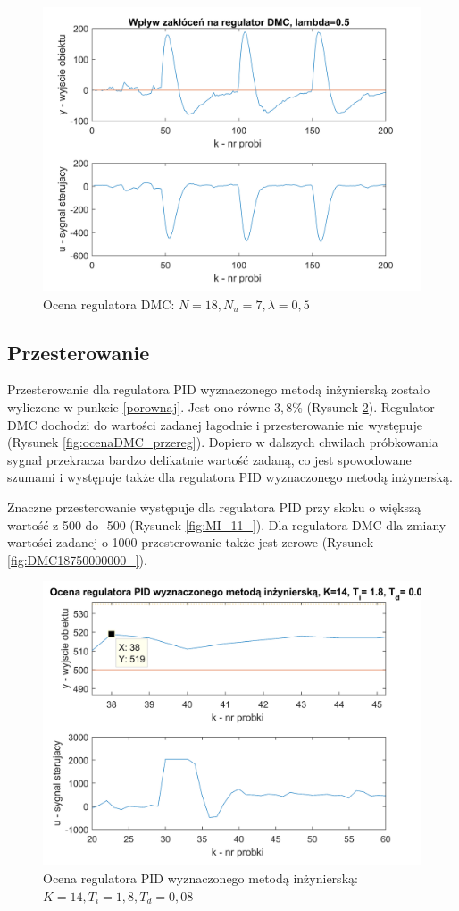 \documentclass[a4paper, 10pt]{article}
\begin{document}
\begin{figure}[H]
	\centering
	\includegraphics[width=0.9\linewidth]{dmc05zakl}
	\caption{Ocena regulatora DMC: $N=18, N_{u}=7, \lambda=0,5$}
	\label{fig:dmc05zakl}
\end{figure}

\subsection{Przesterowanie}
Przesterowanie dla regulatora PID wyznaczonego metodą inżynierską zostało wyliczone w punkcie \ref{porownaj}. Jest ono równe $3,8\%$ (Rysunek \ref{fig:ocenaPIDMI_przereg1}). Regulator DMC dochodzi do wartości zadanej łagodnie i przesterowanie nie występuje (Rysunek \ref{fig:ocenaDMC_przereg}). Dopiero w dalszych chwilach próbkowania sygnał przekracza bardzo delikatnie wartość zadaną, co jest spowodowane szumami i występuje także dla regulatora PID wyznaczonego metodą inżynerską.

Znaczne przesterowanie występuje dla regulatora PID przy skoku o większą wartość z 500 do -500 (Rysunek \ref{fig:MI_11_}). Dla regulatora DMC dla zmiany wartości zadanej o 1000 przesterowanie także jest zerowe (Rysunek \ref{fig:DMC18750000000_}). 


\begin{figure}[H]
	\centering
	\includegraphics[width=0.9\linewidth]{ocenaPIDMI_przereg}
	\caption{Ocena regulatora PID wyznaczonego metodą inżynierską: $K=14, T_{i}=1,8, T_{d}=0,08$}
	\label{fig:ocenaPIDMI_przereg1}
\end{figure}
\end{document}
